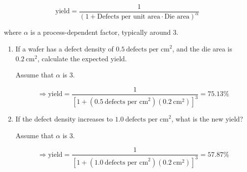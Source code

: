 \documentclass[fleqn]{article}
\begin{document}
\begin{enumerate}
		\begin{equation*}
			\text{yield} = \frac{1}{(1+\text{Defects per unit area} \cdot \text{Die area})^{\alpha}}
		\end{equation*}
		
		where $\alpha$ is a process-dependent factor, typically around 3.
		
		\begin{enumerate}
			\item If a wafer has a defect density of $0.5\ \text{defects per cm}^2$, and the die area is $0.2\ \text{cm}^2$, calculate the expected yield.
			
			Assume that $\alpha$ is 3.
			
			\begin{equation*}
				\Rightarrow \text{yield} = \frac{1}{[1 + (0.5\ \text{defects per cm}^2)(0.2\ \text{cm}^2)]^3} = \mathbf{75.13\%}
			\end{equation*}
			
			\item If the defect density increases to $1.0\ \text{defects per cm}^2$, what is the new yield?
			
			Assume that $\alpha$ is 3.
			
			\begin{equation*}
				\Rightarrow \text{yield} = \frac{1}{[1 + (1.0\ \text{defects per cm}^2)(0.2\ \text{cm}^2)]^3} = \mathbf{57.87\%}
			\end{equation*}
			
		\end{enumerate}
	\end{enumerate}
\end{document}
